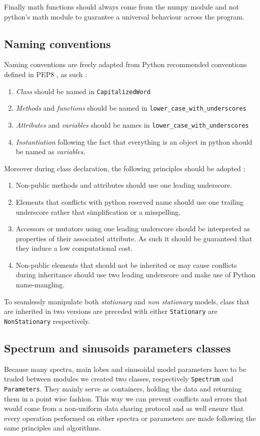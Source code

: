 \documentclass[]{article}
\begin{document}
Finally math functions should always come from the numpy module and not python's math module to guarantee a universal behaviour across the program.

\subsection{Naming conventions}\label{sec:naming-conventions}

Naming conventions are freely adapted from Python recommended conventions defined in PEP8 \cite{pep8}, as such :
\begin{enumerate}[label=(\roman*)]
	\item \emph{Class} should be named in \texttt{CapitalizedWord}
	\item \emph{Methods} and \emph{functions} should be named in \texttt{lower\_case\_with\_underscores}
	\item \emph{Attributes} and \emph{variables} should be names in \texttt{lower\_case\_with\_underscores}
	\item \emph{Instantiation} following the fact that everything is an object in python should be named as \emph{variables}.
\end{enumerate}
Moreover during class declaration, the following principles should be adopted :
\begin{enumerate}[label=(\roman*)]
	\item Non-public methods and attributes should use one leading underscore.
	\item Elements that conflicts with python reserved name should use one trailing underscore rather that simplification or a misspelling.
	\item Accessors or mutators using one leading underscore should be interpreted as properties of their associated attribute. As such it should be guaranteed that they induce a low computational cost.
	\item Non-public elements that should not be inherited or may cause conflicts during inheritance should use two leading underscore and make use of Python name-mangling.
\end{enumerate}
To seamlessly manipulate both \emph{stationary} and \emph{non stationary} models, class that are inherited in two versions are preceded with either \texttt{Stationary} are \texttt{NonStationary} respectively.

\subsection{Spectrum and sinusoids parameters classes}\label{sec:spectrums-and-sinusoids-parameters}
\hspace{15pt}Because many spectra, main lobes and sinusoidal model parameters have to be traded between modules we created two classes, respectively \texttt{Spectrum} and \texttt{Parameters}. They mainly serve as containers, holding the data and returning them in a point wise fashion.
This way we can prevent conflicts and errors that would come from a non-uniform data sharing protocol and as well ensure that every operation performed on either spectra or parameters are made following the same principles and algorithms.
\end{document}
